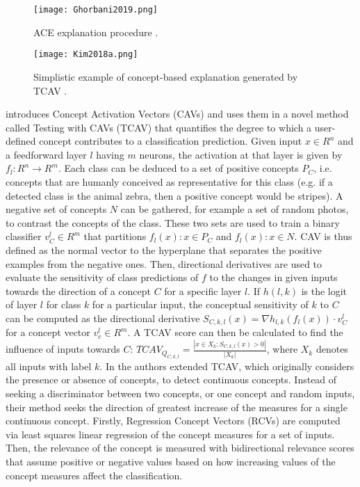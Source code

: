 \documentclass[journal]{IEEEtran}
\begin{document}
\begin{figure}
  \texttt{[image: Ghorbani2019.png]}
  \caption{ACE explanation procedure \cite{Ghorbani2019}.}
\end{figure}

\begin{figure}
  \texttt{[image: Kim2018a.png]}
  \caption{Simplistic example of concept-based explanation generated by TCAV \cite{Kim2018a}.}
\end{figure}

\cite{Kim2018a} \cite{Kim2018} introduces Concept Activation Vectors (CAVs) and uses them in a novel method called Testing with CAVs (TCAV) that quantifies the degree to which a user-defined concept contributes to a classification prediction. Given input $x \in R^n$ and a feedforward layer $l$ having $m$ neurons, the activation at that layer is given by $f_l:R^n \to R^m$. Each class can be deduced to a set of positive concepts $P_C$, i.e. concepts that are humanly conceived as representative for this class (e.g. if a detected class is the animal zebra, then a positive concept would be stripes). A negative set of concepts $N$ can be gathered, for example a set of random photos, to contrast the concepts of the class. These two sets are used to train a binary classifier $v_C^l \in R^m$ that partitions ${f_l (x):x \in P_C}$ and ${f_l (x):x \in N}$. CAV is thus defined as the normal vector to the hyperplane that separates the positive examples from the negative ones. Then, directional derivatives are used to evaluate the sensitivity of class predictions of $f$ to the changes in given inputs towards the direction of a concept $C$ for a specific layer $l$. If $h(l,k)$ is the logit of layer $l$ for class $k$ for a particular input, the conceptual sensitivity of $k$ to $C$ can be computed as the directional derivative $S_{C,k,l}(x)=\nabla h_{l,k} (f_l (x)) \cdot v_C^l$ for a concept vector $v_c^l \in R^m$. A TCAV score can then be calculated to find the influence of inputs towards $C$: $TCAV_{Q_{C,k,l}}= \frac{|{x \in X_k:S_{C,k,l}(x)>0}|}{|X_k|}$, where $X_k$ denotes all inputs with label $k$. 
In \cite{Graziani2018} the authors extended TCAV, which originally considers the presence or absence of concepts, to detect continuous concepts. Instead of seeking a discriminator between two concepts, or one concept and random inputs, their method seeks the direction of greatest increase of the measures for a single continuous concept. Firstly, Regression Concept Vectors (RCVs) are computed via least squares linear regression of the concept measures for a set of inputs. Then, the relevance of the concept is measured with bidirectional relevance scores that assume positive or negative values based on how increasing values of the concept measures affect the classification.
\end{document}
